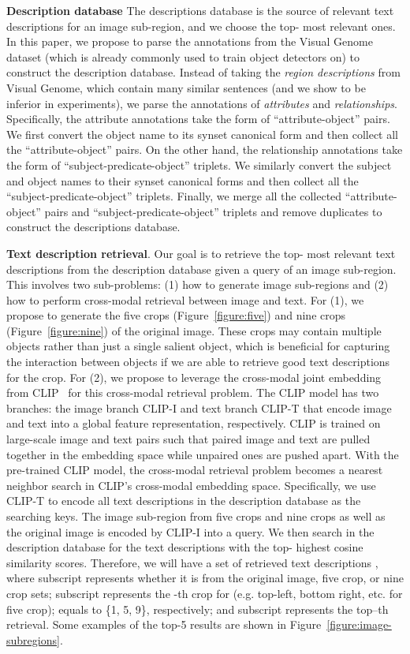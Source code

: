 \documentclass[10pt,twocolumn,letterpaper]{article}
\begin{document}
\textbf{Description database}
The descriptions database is the source of relevant text descriptions for an image sub-region, and we choose the top- most relevant ones.
In this paper, we propose to parse the annotations from the Visual Genome dataset (which is already commonly used to train object detectors on) to construct the description database.
Instead of taking the \textit{region descriptions} from Visual Genome, which contain many similar sentences (and we show to be inferior in experiments), we parse the annotations of \textit{attributes} and \textit{relationships}.
Specifically, the attribute annotations take the form of ``attribute-object'' pairs.
We first convert the object name to its synset canonical form and then collect all the ``attribute-object'' pairs.
On the other hand, the relationship annotations take the form of ``subject-predicate-object'' triplets.
We similarly convert the subject and object names to their synset canonical forms and then collect all the ``subject-predicate-object'' triplets.
Finally, we merge all the collected ``attribute-object'' pairs and ``subject-predicate-object'' triplets and remove duplicates to construct the descriptions database.

\textbf{Text description retrieval}. Our goal is to retrieve the top- most relevant text descriptions from the description database given a query of an image sub-region.
This involves two sub-problems: (1) how to generate image sub-regions and (2) how to perform cross-modal retrieval between image and text.
For (1), we propose to generate the five crops (Figure~\ref{figure:five}) and nine crops (Figure~\ref{figure:nine}) of the original image.
These crops may contain multiple objects rather than just a single salient object, which is beneficial for capturing the interaction between objects if we are able to retrieve good text descriptions for the crop.
For (2), we propose to leverage the cross-modal joint embedding from CLIP~\cite{Radford2021LearningTV} for this cross-modal retrieval problem.
The CLIP model has two branches: the image branch CLIP-I and text branch CLIP-T that encode image and text into a global feature representation,  respectively.
CLIP is trained on large-scale image and text pairs such that paired image and text are pulled together in the embedding space while unpaired ones are pushed apart.
With the pre-trained CLIP model, the cross-modal retrieval problem becomes a nearest neighbor search in CLIP's cross-modal embedding space.
Specifically, we use CLIP-T to encode all text descriptions in the description database as the searching keys.
The image sub-region from five crops and nine crops as well as the original image is encoded by CLIP-I into a query.
We then search in the description database for the text descriptions with the top- highest cosine similarity scores.
Therefore, we will have a set of retrieved text descriptions , where subscript  represents whether it is from the original image, five crop, or nine crop sets; subscript  represents the -th crop for  (e.g. top-left, bottom right, etc. for five crop);  equals to \{1, 5, 9\}, respectively; and subscript  represents the top--th retrieval.
Some examples of the top-5 results are shown in Figure~\ref{figure:image-subregions}.
\end{document}
